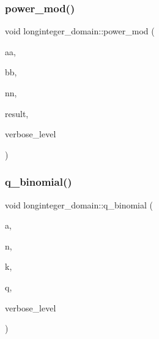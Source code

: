 \mbox{\label{classlonginteger__domain_af9057ed8886e6a2976571b386cde0a64}} 
\subsubsection{\texorpdfstring{power\+\_\+mod()}{power\_mod()}}
{\footnotesize\ttfamily void longinteger\+\_\+domain\+::power\+\_\+mod (\begin{DoxyParamCaption}\item[{char $\ast$}]{aa,  }\item[{char $\ast$}]{bb,  }\item[{char $\ast$}]{nn,  }\item[{\mbox{\hyperlink{classlonginteger__object}{longinteger\+\_\+object}} \&}]{result,  }\item[{\mbox{\hyperlink{galois_8h_a09fddde158a3a20bd2dcadb609de11dc}{I\+NT}}}]{verbose\+\_\+level }\end{DoxyParamCaption})}

\mbox{\label{classlonginteger__domain_af61533e040d0f62d3537c5f96370c37c}} 
\subsubsection{\texorpdfstring{q\+\_\+binomial()}{q\_binomial()}}
{\footnotesize\ttfamily void longinteger\+\_\+domain\+::q\+\_\+binomial (\begin{DoxyParamCaption}\item[{\mbox{\hyperlink{classlonginteger__object}{longinteger\+\_\+object}} \&}]{a,  }\item[{\mbox{\hyperlink{galois_8h_a09fddde158a3a20bd2dcadb609de11dc}{I\+NT}}}]{n,  }\item[{\mbox{\hyperlink{galois_8h_a09fddde158a3a20bd2dcadb609de11dc}{I\+NT}}}]{k,  }\item[{\mbox{\hyperlink{galois_8h_a09fddde158a3a20bd2dcadb609de11dc}{I\+NT}}}]{q,  }\item[{\mbox{\hyperlink{galois_8h_a09fddde158a3a20bd2dcadb609de11dc}{I\+NT}}}]{verbose\+\_\+level }\end{DoxyParamCaption})}

